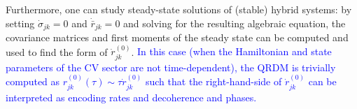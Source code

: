 \documentclass[%
reprint,
superscriptaddress,
nofootinbib,
 amsmath,amssymb,
prx,
floatfix,
]{revtex4-2}
\begin{document}
Furthermore, one can study steady-state solutions of (stable) hybrid systems: by setting $\dot{\sigma}_{jk}= 0$ and $\dot{\bar{r}}_{jk}= 0$  and solving for the resulting algebraic equation, the covariance matrices and first moments of the steady state can be computed and used to find the form of $\dot{r}^{(0)}_{jk}$. \textcolor{blue}{In this case (when the Hamiltonian and state parameters of the CV sector are not time-dependent), the QRDM is trivially computed as $r^{(0)}_{jk}(\tau) \sim \tau \dot{r}^{(0)}_{jk}$ such that the right-hand-side of $\dot{r}^{(0)}_{jk}$ can be interpreted as encoding rates and decoherence and phases.}

 




\end{document}
